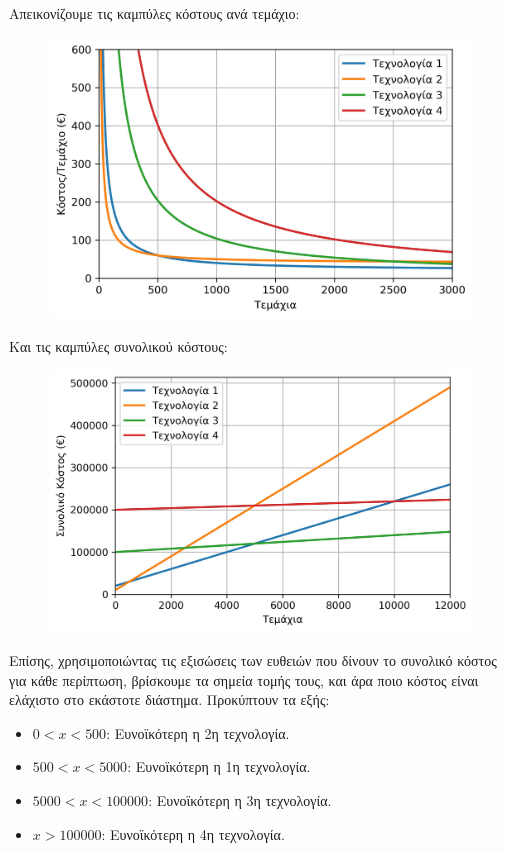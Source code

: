 \documentclass[a4paper]{article}
\begin{document}
\begin{samepage}
	Απεικονίζουμε τις καμπύλες κόστους ανά τεμάχιο:
	\begin{figure}[H]
		\includegraphics[width=\textwidth]{../files/ex4perunitpython.jpg}
	\end{figure}
	
	Και τις καμπύλες συνολικού κόστους:
	
	\begin{figure}[H]
		\includegraphics[width=\textwidth]{../files/ex4totalpython.jpg}
	\end{figure}
\end{samepage}
\begin{samepage}
	Επίσης, χρησιμοποιώντας τις εξισώσεις των ευθειών που δίνουν το συνολικό κόστος για κάθε περίπτωση, βρίσκουμε τα σημεία τομής τους, και άρα ποιο κόστος είναι ελάχιστο στο εκάστοτε διάστημα. Προκύπτουν τα εξής:
	
	\begin{itemize}
		\item $ 0 < x < 500 $: Ευνοϊκότερη η 2η τεχνολογία. 
		\item $ 500 < x < 5000 $: Ευνοϊκότερη η 1η τεχνολογία.
		\item $ 5000 < x < 100000 $: Ευνοϊκότερη η 3η τεχνολογία.
		\item $ x > 100000 $: Ευνοϊκότερη η 4η τεχνολογία.
	\end{itemize}
\end{samepage}
\end{document}
